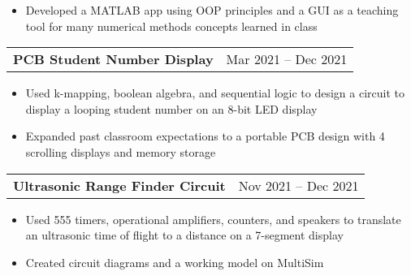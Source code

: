 \documentclass[a4paper,10pt]{article}
\begin{document}
\begin{itemize}[nosep,after=\strut, leftmargin=1em, itemsep=3pt,label=--]
  \item Developed a MATLAB app using OOP principles and a GUI as a teaching tool for many numerical methods concepts learned in class
\end{itemize}
\begin{tabularx}{\linewidth}{@{}X r@{}}
\begin{minipage}[t]{\linewidth}
  \textbf{PCB Student Number Display}
\end{minipage}
&     Mar 2021 -- Dec 2021
\end{tabularx}
\begin{itemize}[nosep,after=\strut, leftmargin=1em, itemsep=3pt,label=--]
  \item Used k-mapping, boolean algebra, and sequential logic to design a circuit to display a looping student number on an 8-bit LED display
\item Expanded past classroom expectations to a portable PCB design with 4 scrolling displays and memory storage
\end{itemize}
\begin{tabularx}{\linewidth}{@{}X r@{}}
\begin{minipage}[t]{\linewidth}
  \textbf{Ultrasonic Range Finder Circuit}
\end{minipage}
&     Nov 2021 -- Dec 2021
\end{tabularx}
\begin{itemize}[nosep,after=\strut, leftmargin=1em, itemsep=3pt,label=--]
  \item Used 555 timers, operational amplifiers, counters, and speakers to translate an ultrasonic time of flight to a distance on a 7-segment display
\item Created circuit diagrams and a working model on MultiSim
\end{itemize}
\end{document}
